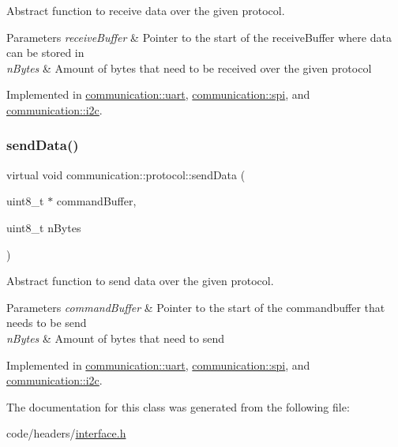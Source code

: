 Abstract function to receive data over the given protocol. 


\begin{DoxyParams}{Parameters}
{\em receive\+Buffer} & Pointer to the start of the receive\+Buffer where data can be stored in \\
\hline
{\em n\+Bytes} & Amount of bytes that need to be received over the given protocol \\
\hline
\end{DoxyParams}


Implemented in \hyperlink{classcommunication_1_1uart_a37a51dcb95fb5178b5fa441acd437ae4}{communication\+::uart}, \hyperlink{classcommunication_1_1spi_a42344d234d3f53829a3edac3949934de}{communication\+::spi}, and \hyperlink{classcommunication_1_1i2c_a112282cf4a6500581c8e252ff2348fea}{communication\+::i2c}.

\mbox{\label{classcommunication_1_1protocol_a1745c4aac1b27bac2d350be54fedc388}} 
\subsubsection{\texorpdfstring{send\+Data()}{sendData()}}
{\footnotesize\ttfamily virtual void communication\+::protocol\+::send\+Data (\begin{DoxyParamCaption}\item[{uint8\+\_\+t $\ast$}]{command\+Buffer,  }\item[{uint8\+\_\+t}]{n\+Bytes }\end{DoxyParamCaption})\hspace{0.3cm}{\ttfamily [pure virtual]}}



Abstract function to send data over the given protocol. 


\begin{DoxyParams}{Parameters}
{\em command\+Buffer} & Pointer to the start of the commandbuffer that needs to be send \\
\hline
{\em n\+Bytes} & Amount of bytes that need to send \\
\hline
\end{DoxyParams}


Implemented in \hyperlink{classcommunication_1_1uart_a915087d1f825171d705801de0981b151}{communication\+::uart}, \hyperlink{classcommunication_1_1spi_a4b0a72ad237253179cff221d92711596}{communication\+::spi}, and \hyperlink{classcommunication_1_1i2c_ad529784d80abf5e8bd493f578503e8e8}{communication\+::i2c}.



The documentation for this class was generated from the following file\+:\begin{DoxyCompactItemize}
\item 
code/headers/\hyperlink{interface_8h}{interface.\+h}\end{DoxyCompactItemize}
